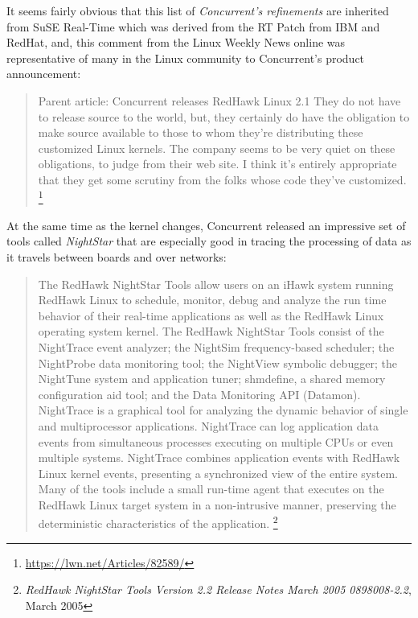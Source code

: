 \documentclass[12pt]{article}
\begin{document}
It seems fairly obvious that this list of \emph{Concurrent's refinements}
are inherited from SuSE Real-Time which was derived from the RT Patch from IBM
and RedHat, and, this comment from the Linux Weekly News online was
representative of many in the
Linux community to Concurrent's product announcement:

\begin{quote}
Parent article: Concurrent releases RedHawk Linux 2.1
They do not have to release source to the world, but,
they certainly do have the obligation to make source
available to those to whom they're distributing these
customized Linux kernels. The company seems to be very quiet on these
obligations, to judge from their web site. I think it's entirely
appropriate that they get some scrutiny from the folks
whose code they've customized.%
\footnote{\url{https://lwn.net/Articles/82589/}}
\end{quote}

At the same time as the kernel changes, Concurrent released an impressive set of
tools called \emph{NightStar} that are especially good in tracing the processing
of data as it travels between boards and over networks:

\begin{quote}
The RedHawk NightStar Tools allow users on an iHawk system running
RedHawk Linux to schedule, monitor, debug and analyze the run time behavior of
their real-time applications as well as the RedHawk Linux operating system
kernel.  The RedHawk NightStar Tools consist of the NightTrace event analyzer;
the NightSim frequency-based scheduler; the NightProbe data monitoring tool; the
NightView symbolic debugger; the NightTune system and application tuner;
shmdefine, a shared memory configuration aid tool; and the Data Monitoring API
(Datamon).  NightTrace is a graphical tool for analyzing the dynamic behavior of
single and multiprocessor applications. NightTrace can log application data
events from simultaneous processes executing on multiple CPUs or even multiple
systems. NightTrace combines application events with RedHawk Linux kernel
events, presenting a synchronized view of the entire system.  Many of the tools
include a small run-time agent that executes on the RedHawk Linux target system
in a non-intrusive manner, preserving the deterministic characteristics of the
application.%
\footnote{\emph{RedHawk NightStar Tools Version 2.2 Release Notes March 2005
0898008-2.2}, March 2005}
\end{quote}
\end{document}
